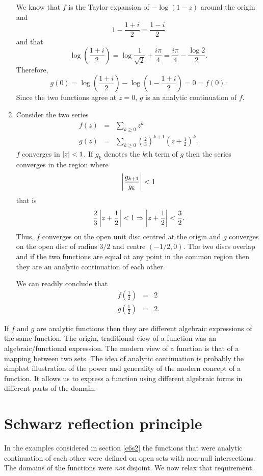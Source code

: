 \begin{enumerate}
We know that $f$ is the Taylor expansion of $-\log(1 - z)$ around the origin and
\[
1 - \frac{1 + i}{2} = \frac{1 - i}{2}
\]
and that
\[
\log\left(\frac{1 + i}{2}\right) = \log\frac{1}{\sqrt{2}} + \frac{i\pi}{4}
= \frac{i\pi}{4} - \frac{\log 2}{2}.
\]
Therefore,
\[
g(0) = \log\left(\frac{1 + i}{2}\right) - \log\left(1 - \frac{1 + i}{2}\right) = 0 = f(0).
\]
Since the two functions agree at $z = 0$, $g$ is an analytic continuation of $f$.

\item Consider the two series \cite{dk}
\begin{eqnarray}
f(z) &=& \sum_{k \ge 0}z^k \label{c6s2e3} \\
g(z) &=& \sum_{k \ge 0}\left(\frac{2}{3}\right)^{k+1}\left(z + \frac{1}{2}\right)^k.
\label{c6s3e4}
\end{eqnarray}
$f$ converges in $\left\vert{z}\right\vert < 1$. If $g_k$ denotes the $k$th term of $g$ then the series
converges in the region where
\[
\left\vert{\frac{g_{k+1}}{g_k}}\right\vert < 1
\]
that is
\[
\frac{2}{3}\left\vert{z + \frac{1}{2}}\right\vert < 1 \Rightarrow \left\vert{z + \frac{1}{2}}\right\vert < \frac{3}{2}.
\]
Thus, $f$ converges on the open unit disc centred at the origin and $g$ converges on
the open disc of radius $3/2$ and centre $(-1/2, 0)$. The two discs overlap and if the
two functions are equal at any point in the common region then they are an analytic
continuation of each other.

We can readily conclude that
\begin{eqnarray*}
f\left(\frac{1}{2}\right) &=& 2 \\
g\left(\frac{1}{2}\right) &=& 2.
\end{eqnarray*}
\end{enumerate}

If $f$ and $g$ are analytic functions then they are different algebraic expressions of
the same function. The origin, traditional view of a function was an algebraic/functional
expression. The modern view of a function is that of a mapping between two sets. The idea
of analytic continuation is probably the simplest illustration of the power and generality
of the modern concept of a function. It allows us to express a function using different
algebraic forms in different parts of the domain.

\section{Schwarz reflection principle}\label{c6s3}
In the examples considered in section \ref{c6s2} the functions that were analytic 
continuation of each other were defined on open sets with non-null intersections. The
domains of the functions were \emph{not} disjoint. We now relax that requirement.

